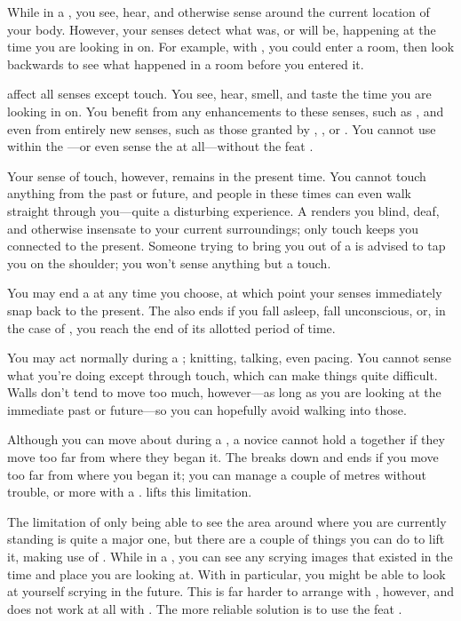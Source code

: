 While in a {\vision}, you see, hear, and otherwise sense around the current location of your body.
However, your senses detect what was, or will be, happening at the time you are looking in on.
For example, with , you could enter a room, then look backwards to see what happened in a room before you entered it.

\capital{\visions} affect all senses except touch.
You see, hear, smell, and taste the time you are looking in on.
You benefit from any enhancements to these senses, such as , and even from entirely new senses, such as those granted by , , or .
You cannot use {\visions} within the {\mentalrealm}---or even sense the {\mentalrealm} at all---without the feat .

Your sense of touch, however, remains in the present time.
You cannot touch anything from the past or future, and people in these times can even walk straight through you---quite a disturbing experience.
A {\vision} renders you blind, deaf, and otherwise insensate to your current surroundings; only touch keeps you connected to the present.
Someone trying to bring you out of a {\vision} is advised to tap you on the shoulder; you won't sense anything but a touch.

You may end a {\vision} at any time you choose, at which point your senses immediately snap back to the present.
The {\vision} also ends if you fall asleep, fall unconscious, or, in the case of , you reach the end of its allotted period of time.

You may act normally during a {\vision}; knitting, talking, even pacing.
You cannot sense what you're doing except through touch, which can make things quite difficult.
Walls don't tend to move too much, however---as long as you are looking at the immediate past or future---so you can hopefully avoid walking into those.

Although you can move about during a {\vision}, a novice cannot hold a {\vision} together if they move too far from where they began it.
The {\vision} breaks down and ends if you move too far from where you began it; you can manage a couple of metres without trouble, or more with a {\test}.
 lifts this limitation.

The limitation of only being able to see the area around where you are currently standing is quite a major one, but there are a couple of things you can do to lift it, making use of .
While in a {\vision}, you can see any scrying images that existed in the time and place you are looking at.
With  in particular, you might be able to look at yourself scrying in the future.
This is far harder to arrange with , however, and does not work at all with .
The more reliable solution is to use the feat .

